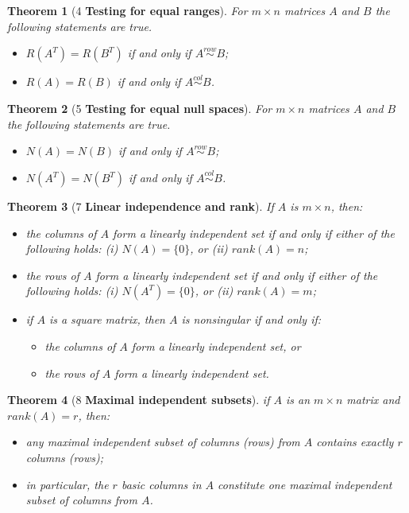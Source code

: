 \documentclass[]{article}
\newtheorem{theo}{Theorem}
\begin{document}
\begin{theo}[4 \textbf{Testing for equal ranges}]
For $m \times n$ matrices $A$ and $B$ the following statements are true.
\begin{itemize}
\item $R(A^T) = R(B^T)$ if and only if $A \overset{row}{\sim} B$;
\item $R(A) = R(B)$ if and only if $A \overset{col}{\sim} B$.
\end{itemize}
\end{theo}
\begin{theo}[5 \textbf{Testing for equal null spaces}]
For $m \times n$ matrices $A$ and $B$ the following statements are true.
\begin{itemize}
\item $N(A) = N(B)$ if and only if $A \overset{row}{\sim} B$;
\item $N(A^T) = N(B^T)$ if and only if $A \overset{col}{\sim} B$.
\end{itemize}
\end{theo}
\begin{theo}[7 \textbf{Linear independence and rank}]
If $A$ is $m \times n$, then:
\begin{itemize}
\item the columns of $A$ form a linearly independent set if and only if either of the following holds: (i) $N(A) = \{0\}$, or (ii) $rank(A) = n$;
\item the rows of $A$ form a linearly independent set if and only if either of the following holds: (i) $N(A^T) = \{0\}$, or (ii) $rank(A) = m$;
\item if $A$ is a square matrix, then $A$ is nonsingular if and only if:
\begin{itemize}
\item the columns of $A$ form a linearly independent set, or
\item the rows of $A$ form a linearly independent set.
\end{itemize}
\end{itemize}
\end{theo}
\begin{theo}[8 \textbf{Maximal independent subsets}]
if $A$ is an $m\times n$ matrix and $rank(A) = r$, then:
\begin{itemize}
\item any maximal independent subset of columns (rows) from $A$ contains exactly $r$ columns (rows);
\item in particular, the $r$ basic columns in $A$ constitute one maximal independent subset of columns from $A$.
\end{itemize}
\end{theo}
\end{document}

